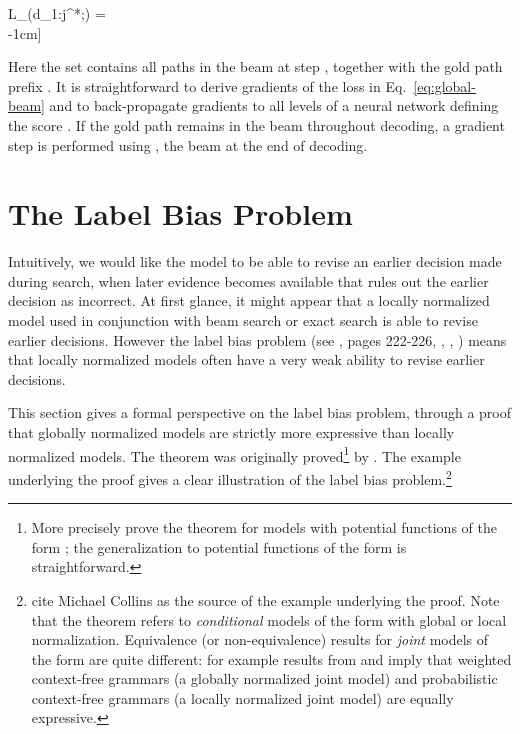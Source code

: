 \documentclass[11pt]{article}
\begin{document}
\hspace*{-3.0cm}  L_(d_{1:j}^*;\theta) = \\
  -1cm]

Here the set  contains all paths in the beam at
step , together with the gold path prefix .
It is straightforward to derive gradients of the loss 
in Eq.~\eqref{eq:global-beam} and to back-propagate gradients to all
levels of a neural network defining the score .
If the gold path remains in the beam throughout decoding, a gradient
step is performed using , the beam at the end of decoding.
 \section{The Label Bias Problem}
\label{sec:label_bias}

Intuitively, we would like the model to be able to revise an earlier
decision made during search, when later evidence becomes available
that rules out the earlier decision as incorrect. At first glance, it
might appear that a locally normalized model used in conjunction with
beam search or exact search is able to revise earlier
decisions. However the label bias problem 
(see ,
pages 222-226,
,
, 
) means that locally normalized models often have a very
weak ability to revise earlier decisions.


This section gives a formal perspective on the label bias problem,
through a proof that globally normalized models are strictly more
expressive than locally normalized models. The theorem was originally
proved\footnote{More precisely  prove the
  theorem for models with potential functions of the form
  ; the generalization to potential
  functions of the form  is
  straightforward.}  by .
The example
underlying the proof gives a clear illustration of the label bias
problem.\footnote{ cite Michael Collins
as the source of the example underlying the proof.  
Note that the theorem refers to {\em conditional} models of the form
 with global or local normalization.
Equivalence (or non-equivalence) results for {\em joint} models of the
form  are quite different: for example
results from  and  imply that weighted
context-free grammars (a globally normalized joint model) and
probabilistic context-free grammars (a locally normalized joint model)
are equally expressive.}
\end{document}
